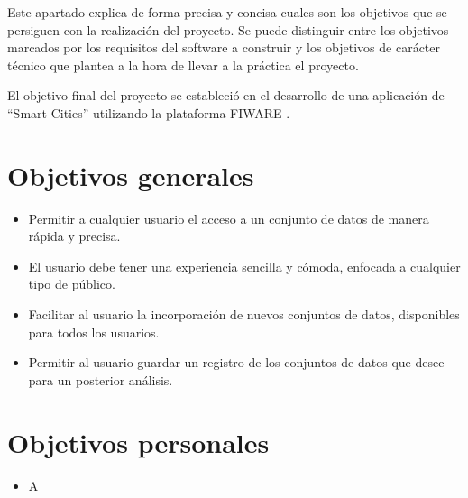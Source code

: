 
Este apartado explica de forma precisa y concisa cuales son los objetivos que se persiguen con la realización del proyecto. Se puede distinguir entre los objetivos marcados por los requisitos del software a construir y los objetivos de carácter técnico que plantea a la hora de llevar a la práctica el proyecto.


El objetivo final del proyecto se estableció en el desarrollo de una aplicación de “Smart Cities” utilizando la plataforma FIWARE \cite{fiware2024}. 

\section{Objetivos generales}\label{objetivos-generales}

\begin{itemize}
\tightlist
\item
  Permitir a cualquier usuario el acceso a un conjunto de datos de manera rápida y precisa.
\item
  El usuario debe tener una experiencia sencilla y cómoda, enfocada a cualquier tipo de público.
\item
  Facilitar al usuario la incorporación de nuevos conjuntos de datos, disponibles para todos los usuarios.
\item
  Permitir al usuario guardar un registro de los conjuntos de datos que desee para un posterior análisis.
\end{itemize}



\section{Objetivos personales}\label{objetivos-personales}

\begin{itemize}
\tightlist
\item
  A

\end{itemize}